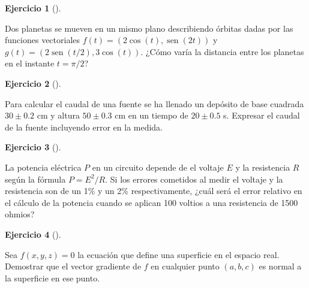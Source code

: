 \documentclass[
  a4paper,
]{scrreport}
\theoremstyle{definition}
\newtheorem{exercise}{Ejercicio}[chapter]
\theoremstyle{remark}
\begin{document}
\begin{exercise}[]\protect\hypertarget{exr-distancia-planetas}{}\label{exr-distancia-planetas}

Dos planetas se mueven en un mismo plano describiendo órbitas dadas por
las funciones vectoriales \(f(t) = (2 \cos(t), \operatorname{sen}(2t))\)
y \(g(t) = (2\operatorname{sen}(t/2), 3\cos(t))\). ¿Cómo varía la
distancia entre los planetas en el instante \(t=\pi/2\)?

\end{exercise}

\begin{exercise}[]\protect\hypertarget{exr-transmision-errores-caudal-fuente}{}\label{exr-transmision-errores-caudal-fuente}

Para calcular el caudal de una fuente se ha llenado un depósito de base
cuadrada \(30\pm 0.2\) cm y altura \(50\pm 0.3\) cm en un tiempo de
\(20\pm 0.5\) s. Expresar el caudal de la fuente incluyendo error en la
medida.

\end{exercise}

\begin{exercise}[]\protect\hypertarget{exr-transmision-errores-potencial-electrico}{}\label{exr-transmision-errores-potencial-electrico}

La potencia eléctrica \(P\) en un circuito depende de el voltaje \(E\) y
la resistencia \(R\) según la fórmula \(P = E^2/R\). Si los errores
cometidos al medir el voltaje y la resistencia son de un 1\% y un 2\%
respectivamente, ¿cuál será el error relativo en el cálculo de la
potencia cuando se aplican 100 voltios a una resistencia de 1500 ohmios?

\end{exercise}

\begin{exercise}[]\protect\hypertarget{exr-vector-gradiente-normal-curvas-nivel}{}\label{exr-vector-gradiente-normal-curvas-nivel}

Sea \(f(x,y,z)=0\) la ecuación que define una superficie en el espacio
real. Demostrar que el vector gradiente de \(f\) en cualquier punto
\((a, b, c)\) es normal a la superficie en ese punto.

\end{exercise}
\end{document}
